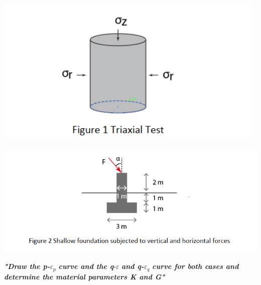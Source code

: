 \documentclass{article}
\begin{document}
\begin{par}
\begin{center}
\includegraphics[width=13cm]{image_0}
\end{center}
\end{par}

\begin{par}
\begin{center}
\includegraphics[width=15cm]{image_1}
\end{center}
\end{par}



\vspace{1em}
\label{H_9755D2F4}

\begin{par}
\begin{flushleft}
\textit{\textbf{"Draw the p-}}$\varepsilon_{p}$ \textit{\textbf{curve and the q}}-$\varepsilon$\textit{\textbf{ and q-}}$\varepsilon_{q}$\textit{\textbf{ curve for both cases and determine the material parameters K and G"}}
\end{flushleft}
\end{par}
\end{document}
